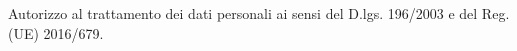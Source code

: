 \vspace*{\fill}
\begin{cvparagraph}
	Autorizzo al trattamento dei dati personali ai sensi del D.lgs. 196/2003 e del Reg.(UE) 2016/679.
\end{cvparagraph}
